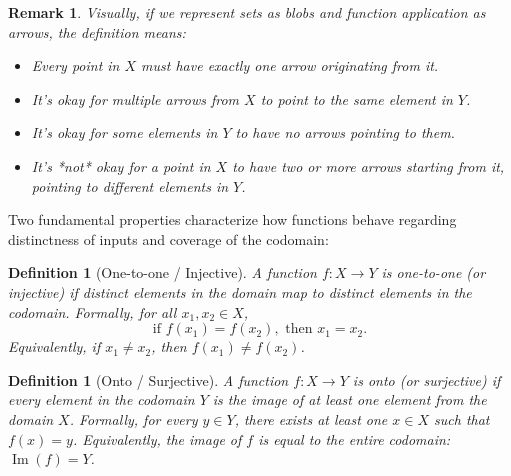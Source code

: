 \documentclass[11pt, letterpaper]{article}
\theoremstyle{mytheoremstyle}
\theoremstyle{mydefinitionstyle}
\newtheorem{definition}[theorem]{Definition}
\theoremstyle{myremarkstyle}
\newtheorem{remark}[theorem]{Remark}
\DeclareMathOperator{\im}{Im} %
\begin{document}
\begin{remark}
Visually, if we represent sets as blobs and function application as arrows, the definition means:
\begin{itemize}
    \item Every point in $X$ must have exactly one arrow originating from it.
    \item It's okay for multiple arrows from $X$ to point to the same element in $Y$.
    \item It's okay for some elements in $Y$ to have no arrows pointing to them.
    \item It's *not* okay for a point in $X$ to have two or more arrows starting from it, pointing to different elements in $Y$.
\end{itemize}
\end{remark}

Two fundamental properties characterize how functions behave regarding distinctness of inputs and coverage of the codomain:

\begin{definition}[One-to-one / Injective]
A function $f: X \to Y$ is \emph{one-to-one} (or \emph{injective}) if distinct elements in the domain map to distinct elements in the codomain. Formally, for all $x_1, x_2 \in X$,
\[ \text{if } f(x_1) = f(x_2), \text{ then } x_1 = x_2. \]
Equivalently, if $x_1 \neq x_2$, then $f(x_1) \neq f(x_2)$.
\end{definition}

\begin{definition}[Onto / Surjective]
A function $f: X \to Y$ is \emph{onto} (or \emph{surjective}) if every element in the codomain $Y$ is the image of \emph{at least one} element from the domain $X$. Formally, for every $y \in Y$, there exists at least one $x \in X$ such that $f(x) = y$.
Equivalently, the image of $f$ is equal to the entire codomain: $\im(f) = Y$.
\end{definition}
\end{document}
